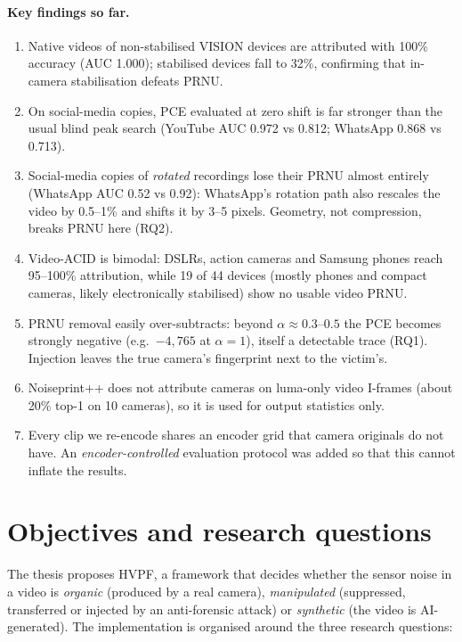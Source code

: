 \documentclass[11pt,a4paper]{article}
\begin{document}
\paragraph{Key findings so far.}
\begin{enumerate}
  \item Native videos of non-stabilised VISION devices are attributed with 100\% accuracy (AUC 1.000);
        stabilised devices fall to 32\%, confirming that in-camera stabilisation defeats PRNU.
  \item On social-media copies, PCE evaluated at zero shift is far stronger than the usual blind peak
        search (YouTube AUC 0.972 vs 0.812; WhatsApp 0.868 vs 0.713).
  \item Social-media copies of \emph{rotated} recordings lose their PRNU almost entirely (WhatsApp AUC
        0.52 vs 0.92): WhatsApp's rotation path also rescales the video by 0.5--1\% and shifts it by
        3--5 pixels. Geometry, not compression, breaks PRNU here (RQ2).
  \item Video-ACID is bimodal: DSLRs, action cameras and Samsung phones reach 95--100\% attribution,
        while 19 of 44 devices (mostly phones and compact cameras, likely electronically stabilised) show no
        usable video PRNU.
  \item PRNU removal easily over-subtracts: beyond $\alpha\approx0.3$--$0.5$ the PCE becomes strongly
        negative (e.g.\ $-4{,}765$ at $\alpha=1$), itself a detectable trace (RQ1). Injection leaves the true
        camera's fingerprint next to the victim's.
  \item Noiseprint++ does not attribute cameras on luma-only video I-frames (about 20\% top-1 on 10
        cameras), so it is used for output statistics only.
  \item Every clip we re-encode shares an encoder grid that camera originals do not have. An
        \emph{encoder-controlled} evaluation protocol was added so that this cannot inflate the results.
\end{enumerate}

\section{Objectives and research questions}

The thesis proposes HVPF, a framework that decides whether the sensor noise in a video is
\emph{organic} (produced by a real camera), \emph{manipulated} (suppressed, transferred or injected
by an anti-forensic attack) or \emph{synthetic} (the video is AI-generated). The implementation is
organised around the three research questions:
\end{document}
